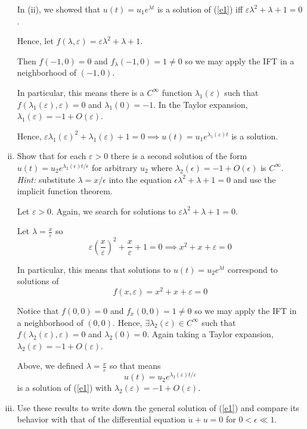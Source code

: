 \documentclass[12pt]{article}
\newcommand{\ep}{\varepsilon}
\begin{document}
\begin{enumerate}[(i)]
          \color{blue}
          In (ii), we showed that $u(t) = u_1 e^{\lambda t}$ is a solution of (\ref{e1}) iff $\ep \lambda^2 + \lambda + 1 = 0$.

          Hence, let $f(\lambda, \ep) = \ep \lambda^2 + \lambda + 1$.

          Then $f(-1, 0) =0$ and $f_{\lambda}(-1, 0) = 1 \neq 0$ so we may apply the IFT in a neighborhood of $(-1, 0)$.

          In particular, this means there is a $C^{\infty}$ function $\lambda_1(\ep)$ such that $f(\lambda_1(\ep), \ep) = 0$ and $\lambda_1(0) = -1$. In the Taylor expansion, $\lambda_1(\ep) = -1 + O(\ep)$.

          Hence, $\ep \lambda_1(\ep)^2 + \lambda_1(\ep) + 1 = 0 \implies u(t) = u_1 e^{\lambda_1(\ep)t}$ is a solution.

          \color{black}

    \item Show that for each $\varepsilon>0$ there is a second solution of the form $u(t)=u_2e^{\lambda_2(\epsilon)t/\epsilon}$ for arbitrary $u_2$ where $\lambda_2(\epsilon)=-1+O(\epsilon)$ is $C^\infty$. \emph{Hint:} substitute $\lambda=x/\epsilon$ into the equation $\epsilon\lambda^2+\lambda+1=0$ and use the implicit function theorem.

          \color{blue}
          Let $\ep > 0$. Again, we search for solutions to $\ep \lambda^2 + \lambda + 1 = 0$.

          Let $\lambda = \frac{x}{\ep}$ so
          \[\ep \left(\frac{x}{\ep}\right)^2 + \frac{x}{\ep} + 1 = 0 \implies x^2 + x + \ep = 0\]

          In particular, this means that solutions to $u(t) = u_2 e^{\lambda t}$ correspond to solutions of
          \[f(x, \ep) = x^2 + x + \ep = 0\]

          Notice that $f(0, 0) = 0$ and $f_x(0, 0) = 1 \neq 0$ so we may apply the IFT in a neighborhood of $(0, 0)$. Hence, $\exists \lambda_2(\ep) \in C^{\infty}$ such that $f(\lambda_2(\ep), \ep) = 0$ and $\lambda_2(0) = 0$. Again taking a Taylor expansion, $\lambda_2(\ep) = -1 + O(\ep)$.

          Above, we defined $\lambda = \frac{x}{\ep}$ so that means
          \[u(t) = u_2 e^{\lambda_2(\ep)t/\ep}\]
          is a solution of (\ref{e1}) with $\lambda_2(\ep) = -1 + O(\ep)$.

          \color{black}

    \item Use these results to write down the general solution of (\ref{e1}) and compare its behavior with that of the differential equation $\dot{u}+u=0$ for $0<\epsilon\ll1$.


\end{enumerate}
\end{document}
